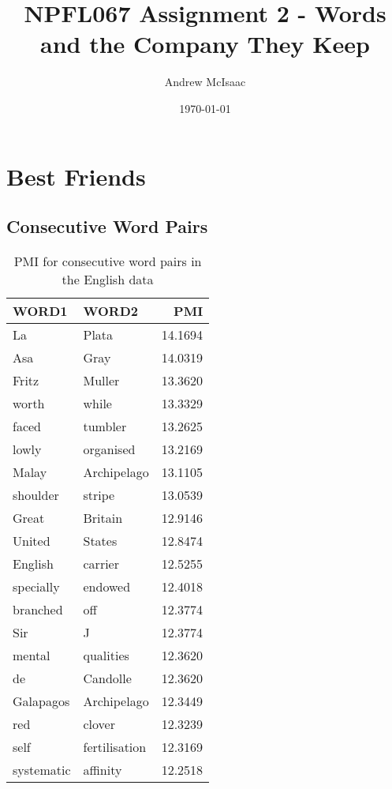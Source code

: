 \documentclass[a4paper]{article}
\title{NPFL067 Assignment 2 - Words and the Company They Keep}
\date{\today}
\author{Andrew McIsaac}
\begin{document}
\maketitle

    \section{Best Friends}

    \subsection{Consecutive Word Pairs}

    \begin{table}[h!]
        \centering
        \caption{PMI for consecutive word pairs in the English data}
        \label{tab:cons_en}
        \begin{tabular}{llr}
        \toprule
             WORD1 &          WORD2 &      PMI \\
        \midrule
                La &          Plata &  14.1694 \\
               Asa &           Gray &  14.0319 \\
             Fritz &         Muller &  13.3620 \\
             worth &          while &  13.3329 \\
             faced &        tumbler &  13.2625 \\
             lowly &      organised &  13.2169 \\
             Malay &    Archipelago &  13.1105 \\
          shoulder &         stripe &  13.0539 \\
             Great &        Britain &  12.9146 \\
            United &         States &  12.8474 \\
           English &        carrier &  12.5255 \\
         specially &        endowed &  12.4018 \\
          branched &            off &  12.3774 \\
               Sir &              J &  12.3774 \\
            mental &      qualities &  12.3620 \\
                de &       Candolle &  12.3620 \\
         Galapagos &    Archipelago &  12.3449 \\
               red &         clover &  12.3239 \\
              self &  fertilisation &  12.3169 \\
        systematic &       affinity &  12.2518 \\
        \bottomrule
        \end{tabular}
    \end{table}
\end{document}
